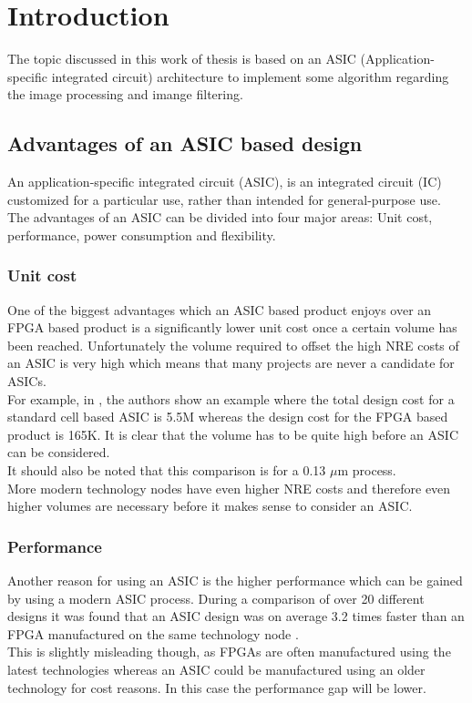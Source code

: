 \chapter{Introduction}
The topic discussed in this work of thesis is based on an ASIC (Application-specific integrated circuit) architecture to implement some algorithm regarding the image processing and imange filtering.\\
\section{Advantages of an ASIC based design}
An application-specific integrated circuit (ASIC), is an integrated circuit (IC) customized for a particular use, rather than intended for general-purpose use.\\
The advantages of an ASIC can be divided into four major areas: Unit
cost, performance, power consumption and flexibility. 
\subsection{Unit cost}
One of the biggest advantages which an ASIC based product enjoys over
an FPGA based product is a significantly lower unit cost once a certain
volume has been reached. Unfortunately the volume required to offset
the high NRE costs of an ASIC is very high which means that many
projects are never a candidate for ASICs.\\
For example, in \cite{asic1}, the authors show an example where the total design cost for a standard cell based ASIC is \textdollar 5.5M whereas the design cost for the FPGA based product is \textdollar165K. It is clear that the volume has to be quite high before an ASIC can be considered. \\It should also be noted that this comparison is for a 0.13 $ \mu $m process.\\ More modern technology nodes have even higher NRE costs and therefore even higher volumes are necessary before it makes
sense to consider an ASIC.


\subsection{Performance}
Another reason for using an ASIC is the higher performance which can
be gained by using a modern ASIC process. During a comparison of over
20 different designs it was found that an ASIC design was on average 3.2
times faster than an FPGA manufactured on the same technology node
\cite{asic2}. \\This is slightly misleading though, as FPGAs are often manufactured using the latest technologies whereas an ASIC could be manufactured
using an older technology for cost reasons. In this case the performance
gap will be lower.

